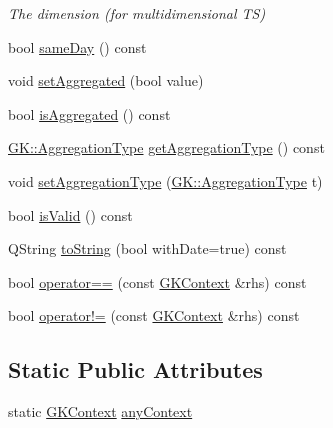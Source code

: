 \begin{DoxyCompactItemize}
\begin{DoxyCompactList}\small\item\em The dimension (for multidimensional TS) \end{DoxyCompactList}\item 
bool \hyperlink{classGKContext_a7a758cca958715f1db31ec67d191ef99}{same\+Day} () const 
\item 
void \hyperlink{classGKContext_a016f3c6735246f6c6ea270dcc2d5e9d5}{set\+Aggregated} (bool value)
\item 
bool \hyperlink{classGKContext_a47043679596801c39a9eecfe6f8ada7b}{is\+Aggregated} () const 
\item 
\hyperlink{namespaceGK_ae682f9fb77047e45fa91c27e569b8fee}{G\+K\+::\+Aggregation\+Type} \hyperlink{classGKContext_a6c248a04710043307381502416350310}{get\+Aggregation\+Type} () const 
\item 
void \hyperlink{classGKContext_ac83b083d77cfa532f2deacc316b11fb9}{set\+Aggregation\+Type} (\hyperlink{namespaceGK_ae682f9fb77047e45fa91c27e569b8fee}{G\+K\+::\+Aggregation\+Type} t)
\item 
bool \hyperlink{classGKContext_aa90ee9c956bd9523ba52df5a168eecd0}{is\+Valid} () const 
\item 
Q\+String \hyperlink{classGKContext_a47664e26a94b558165fbe9a99cfef156}{to\+String} (bool with\+Date=true) const 
\item 
bool \hyperlink{classGKContext_a4fceb046a3eca904089f3edbba5b15b7}{operator==} (const \hyperlink{classGKContext}{G\+K\+Context} \&rhs) const 
\item 
bool \hyperlink{classGKContext_ad646873a65bc7e663b659e9c0f117a9d}{operator!=} (const \hyperlink{classGKContext}{G\+K\+Context} \&rhs) const 
\end{DoxyCompactItemize}
\subsection*{Static Public Attributes}
\begin{DoxyCompactItemize}
\item 
static \hyperlink{classGKContext}{G\+K\+Context} \hyperlink{classGKContext_a37de2dc1b6bab087b9b92a445922e79d}{any\+Context}
\end{DoxyCompactItemize}
